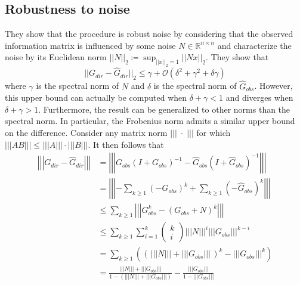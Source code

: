 \documentclass[../Thesis.tex]{subfiles}
\begin{document}
\subsection{Robustness to noise}
They show that the procedure is robust noise by considering that the observed information matrix is influenced by some noise $N\in \mathbb{R}^{n\times n}$ and characterize the noise by its Euclidean norm $||N||_{2} \coloneq \sup_{||x||_2 = 1} ||Nx||_2$. They show that
$$||G_{dir} - \hat{G}_{dir}||_{2} \leq \gamma + \mathcal{O}\left( \delta^2 + \gamma^2 + \delta \gamma \right)$$
where $\gamma$ is the spectral norm of $N$ and $\delta$ is the spectral norm of $\hat{G}_{obs}$. However, this upper bound can actually be computed when $\delta + \gamma < 1$ and diverges when $\delta + \gamma > 1$. Furthermore, the result can be generalized to other norms than the spectral norm. In particular, the Frobenius norm admits a similar upper bound on the difference. Consider any matrix norm $\left|\left|\left|\; \cdot \; \right|\right|\right|$ for which $\left|\left|\left| A B \right|\right|\right| \leq \left|\left|\left|A\right|\right|\right| \cdot \left|\left|\left| B \right|\right|\right|$. It then follows that
\begin{align*}
    \left|\left|\left| G_{dir} - \hat{G}_{dir} \right|\right|\right| & = \left|\left|\left| G_{obs} \left(I + G_{obs}\right)^{-1} - \hat{G}_{obs} \left(I + \hat{G}_{obs}\right)^{-1} \right|\right|\right|   \\
                                                          & = \left|\left|\left| - \sum_{k\geq 1} \left( - G_{obs}\right)^k  +  \sum_{k\geq 1} \left(-\hat{G}_{obs}\right)^k \right|\right|\right| \\
                                                          & \leq \sum_{k\geq 1} \left|\left|\left|  G_{obs}^k  -  \left(G_{obs} + N\right)^k \right|\right|\right| \\
                                                          & \leq \sum_{k \geq 1} \sum_{i=1}^{k} \begin{pmatrix}k\\i\end{pmatrix} \left|\left|\left| N \right|\right|\right|^i \left|\left|\left| G_{obs} \right|\right|\right|^{k-i}                           \\
                                                          & = \sum_{k\geq 1} \left( \left( \,\left|\left|\left| N \right|\right|\right| + \left|\left|\left| G_{obs} \right|\right|\right|\,\right)^k - \left|\left|\left| G_{obs} \right|\right|\right|^k \right)                                           \\
                                                          & = \frac{\left|\left|\left| N \right|\right|\right| + \left|\left|\left| G_{obs} \right|\right|\right|}{1 - \left(\left|\left|\left| N \right|\right|\right| + \left|\left|\left| G_{obs} \right|\right|\right|\right)} - \frac{\left|\left|\left| G_{obs} \right|\right|\right|}{1 - \left|\left|\left| G_{obs} \right|\right|\right|}
\end{align*}
\end{document}
